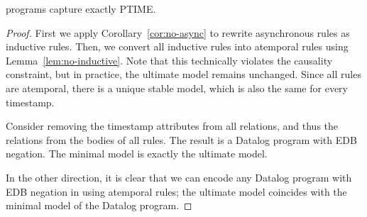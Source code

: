 
\begin{theorem}
\slang programs capture exactly PTIME.
\end{theorem}
\begin{proof}
First we apply Corollary~\ref{cor:no-async} to rewrite asynchronous rules as inductive rules.  Then, we convert all inductive rules into atemporal rules using Lemma~\ref{lem:no-inductive}.  Note that this technically violates the causality constraint, but in practice, the ultimate model remains unchanged.  Since all rules are atemporal, there is a unique stable model, which is also the same for every timestamp.

Consider removing the timestamp attributes from all relations, and thus the  relations from the bodies of all rules.  The result is a Datalog program with EDB negation.  The minimal model is exactly the ultimate model.

In the other direction, it is clear that we can encode any Datalog program with EDB negation in \slang using atemporal rules; the ultimate model coincides with the minimal model of the Datalog program.
\end{proof}



